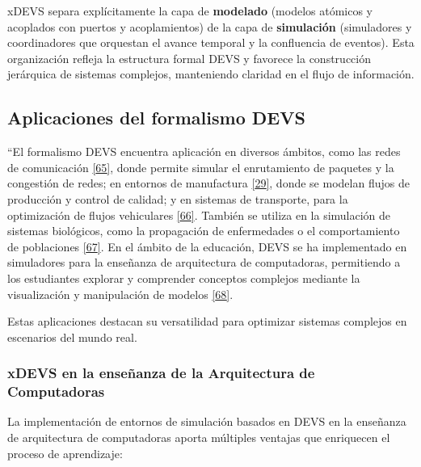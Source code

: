 \documentclass[12pt,oneside]{templates/unerthesis}
\begin{document}
xDEVS separa explícitamente la capa de \textbf{modelado} (modelos atómicos y acoplados con puertos y acoplamientos) de la capa de \textbf{simulación} (simuladores y coordinadores que orquestan el avance temporal y la confluencia de eventos). Esta organización refleja la estructura formal DEVS y favorece la construcción jerárquica de sistemas complejos, manteniendo claridad en el flujo de información.

\hypertarget{aplicaciones-del-formalismo-devs}{%
\subsection{Aplicaciones del formalismo DEVS}\label{aplicaciones-del-formalismo-devs}}

``El formalismo DEVS encuentra aplicación en diversos ámbitos, como las redes de comunicación \protect\hyperlink{ref-fujimoto2001parallel}{{[}65{]}}, donde permite simular el enrutamiento de paquetes y la congestión de redes; en entornos de manufactura \protect\hyperlink{ref-zeigler_theory_2000}{{[}29{]}}, donde se modelan flujos de producción y control de calidad; y en sistemas de transporte, para la optimización de flujos vehiculares \protect\hyperlink{ref-barros1997modeling}{{[}66{]}}. También se utiliza en la simulación de sistemas biológicos, como la propagación de enfermedades o el comportamiento de poblaciones \protect\hyperlink{ref-zeigler2004continuity}{{[}67{]}}. En el ámbito de la educación, DEVS se ha implementado en simuladores para la enseñanza de arquitectura de computadoras, permitiendo a los estudiantes explorar y comprender conceptos complejos mediante la visualización y manipulación de modelos \protect\hyperlink{ref-calvo2010simulador}{{[}68{]}}.

Estas aplicaciones destacan su versatilidad para optimizar sistemas complejos en escenarios del mundo real.

\hypertarget{xdevs-en-la-enseuxf1anza-de-la-arquitectura-de-computadoras}{%
\subsubsection{xDEVS en la enseñanza de la Arquitectura de Computadoras}\label{xdevs-en-la-enseuxf1anza-de-la-arquitectura-de-computadoras}}

La implementación de entornos de simulación basados en DEVS en la enseñanza de arquitectura de computadoras aporta múltiples ventajas que enriquecen el proceso de aprendizaje:
\end{document}
